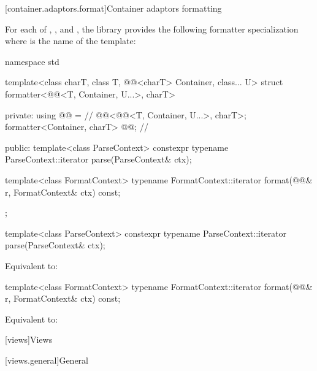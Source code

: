 [container.adaptors.format]{Container adaptors formatting}

\pnum
For each of
,
, and
,
the library provides the following formatter specialization
where  is the name of the template:

%
\begin{codeblock}
namespace std {
  template<class charT, class T, @@<charT> Container, class... U>
  struct formatter<@@<T, Container, U...>, charT> {
  private:
    using @@ =                                   // \expos
      @@<@@<T, Container, U...>, charT>;
    formatter<Container, charT> @@;                      // \expos

  public:
    template<class ParseContext>
      constexpr typename ParseContext::iterator
        parse(ParseContext& ctx);

    template<class FormatContext>
      typename FormatContext::iterator
        format(@@& r, FormatContext& ctx) const;
  };
}
\end{codeblock}

%
\begin{itemdecl}
template<class ParseContext>
  constexpr typename ParseContext::iterator
    parse(ParseContext& ctx);
\end{itemdecl}

\begin{itemdescr}
\pnum
\effects
Equivalent to: 
\end{itemdescr}

%
\begin{itemdecl}
template<class FormatContext>
  typename FormatContext::iterator
    format(@@& r, FormatContext& ctx) const;
\end{itemdecl}

\begin{itemdescr}
\pnum
\effects
Equivalent to: 
\end{itemdescr}

[views]{Views}

[views.general]{General}

